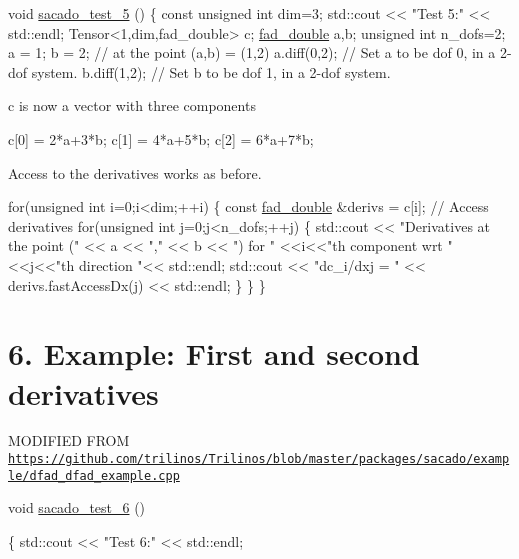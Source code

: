 \begin{DoxyCode}
\textcolor{keywordtype}{void} \hyperlink{Sacado__example_8cc_a327dbbb4ea7fc9840c46d149843a44c2}{sacado\_test\_5} ()
\{
    \textcolor{keyword}{const} \textcolor{keywordtype}{unsigned} \textcolor{keywordtype}{int} dim=3;
    std::cout << \textcolor{stringliteral}{"Test 5:"} << std::endl;
    Tensor<1,dim,fad\_double> c;
    \hyperlink{Sacado__example_8cc_a868b94676739e612d9c95940e70892a9}{fad\_double} a,b;
    \textcolor{keywordtype}{unsigned} \textcolor{keywordtype}{int} n\_dofs=2;
    a = 1; b = 2;   \textcolor{comment}{// at the point (a,b) = (1,2)}
    a.diff(0,2);  \textcolor{comment}{// Set a to be dof 0, in a 2-dof system.}
    b.diff(1,2);  \textcolor{comment}{// Set b to be dof 1, in a 2-dof system.}
\end{DoxyCode}
 c is now a vector with three components 
\begin{DoxyCode}
c[0] = 2*a+3*b;
c[1] = 4*a+5*b;
c[2] = 6*a+7*b;
\end{DoxyCode}
 Access to the derivatives works as before. 
\begin{DoxyCode}
    \textcolor{keywordflow}{for}(\textcolor{keywordtype}{unsigned} \textcolor{keywordtype}{int} i=0;i<dim;++i)
    \{
        \textcolor{keyword}{const} \hyperlink{Sacado__example_8cc_a868b94676739e612d9c95940e70892a9}{fad\_double} &derivs = c[i]; \textcolor{comment}{// Access derivatives}
        \textcolor{keywordflow}{for}(\textcolor{keywordtype}{unsigned} \textcolor{keywordtype}{int} j=0;j<n\_dofs;++j)
        \{
            std::cout << \textcolor{stringliteral}{"Derivatives at the point ("} << a << \textcolor{stringliteral}{","} << b << \textcolor{stringliteral}{") for "}
            <<i<<\textcolor{stringliteral}{"th component wrt "}<<j<<\textcolor{stringliteral}{"th direction "}<< std::endl;
            std::cout << \textcolor{stringliteral}{"dc\_i/dxj = "} << derivs.fastAccessDx(j) << std::endl;            
        \}
    \}
\}
\end{DoxyCode}
 \hypertarget{index_Ex6}{}\section{6. Example\+: First and second derivatives}\label{index_Ex6}
M\+O\+D\+I\+F\+I\+ED F\+R\+OM \href{https://github.com/trilinos/Trilinos/blob/master/packages/sacado/example/dfad_dfad_example.cpp}{\tt https\+://github.\+com/trilinos/\+Trilinos/blob/master/packages/sacado/example/dfad\+\_\+dfad\+\_\+example.\+cpp} 
\begin{DoxyCode}
\textcolor{keywordtype}{void} \hyperlink{Sacado__example_8cc_a27450ab52a9d4250e3f5a5f2a3f8f317}{sacado\_test\_6} ()
 
\{
    std::cout << \textcolor{stringliteral}{"Test 6:"} << std::endl;
\end{DoxyCode}
